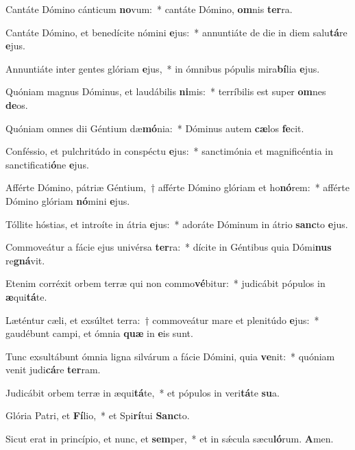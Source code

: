 \item Cantáte Dómino cánticum \textbf{no}vum:~* cantáte Dómino, \textbf{om}nis \textbf{ter}ra.

\item Cantáte Dómino, et benedícite nómini \textbf{e}jus:~* annuntiáte de die in diem salu\textbf{tá}re \textbf{e}jus.

\item Annuntiáte inter gentes glóriam \textbf{e}jus,~* in ómnibus pópulis mira\textbf{bí}lia \textbf{e}jus.

\item Quóniam magnus Dóminus, et laudábilis \textbf{ni}mis:~* terríbilis est super \textbf{om}nes \textbf{de}os.

\item Quóniam omnes dii Géntium dæ\textbf{mó}nia:~* Dóminus autem \textbf{cæ}los \textbf{fe}cit.

\item Conféssio, et pulchritúdo in conspéctu \textbf{e}jus:~* sanctimónia et magnificéntia in sanctificati\textbf{ó}ne \textbf{e}jus.

\item Afférte Dómino, pátriæ Géntium,~† afférte Dómino glóriam et ho\textbf{nó}rem:~* afférte Dómino glóriam \textbf{nó}mini \textbf{e}jus.

\item Tóllite hóstias, et introíte in átria \textbf{e}jus:~* adoráte Dóminum in átrio \textbf{sanc}to \textbf{e}jus.

\item Commoveátur a fácie ejus univérsa \textbf{ter}ra:~* dícite in Géntibus quia Dómi\textbf{nus} re\textbf{gná}vit.

\item Etenim corréxit orbem terræ qui non commo\textbf{vé}bitur:~* judicábit pópulos in \textbf{æ}qui\textbf{tá}te.

\item Læténtur cæli, et exsúltet terra:~† commoveátur mare et plenitúdo \textbf{e}jus:~* gaudébunt campi, et ómnia \textbf{quæ} in \textbf{e}is sunt.

\item Tunc exsultábunt ómnia ligna silvárum a fácie Dómini, quia \textbf{ve}nit:~* quóniam venit judi\textbf{cá}re \textbf{ter}ram.

\item Judicábit orbem terræ in æqui\textbf{tá}te,~* et pópulos in veri\textbf{tá}te \textbf{su}a.

\item Glória Patri, et \textbf{Fí}lio,~* et Spi\textbf{rí}tui \textbf{Sanc}to.

\item Sicut erat in princípio, et nunc, et \textbf{sem}per,~* et in sǽcula sæcu\textbf{ló}rum. \textbf{A}men.
